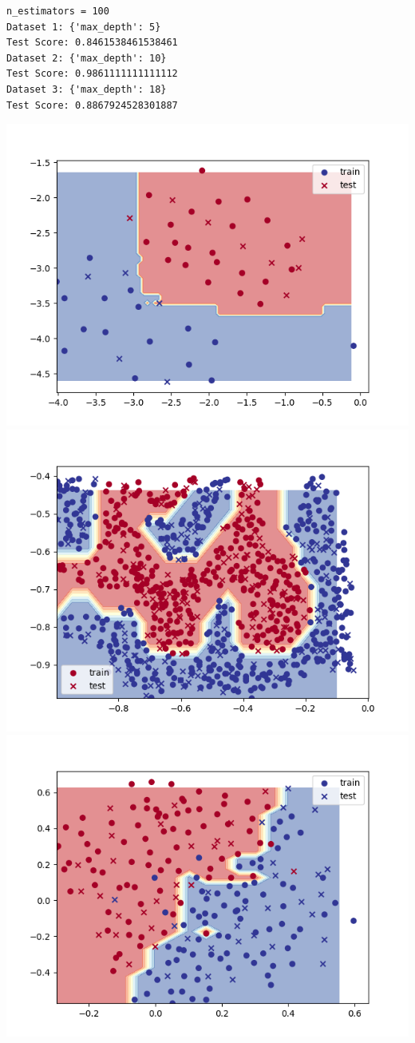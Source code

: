     \begin{verbatim}
n_estimators = 100
Dataset 1: {'max_depth': 5}
Test Score: 0.8461538461538461
Dataset 2: {'max_depth': 10}
Test Score: 0.9861111111111112
Dataset 3: {'max_depth': 18}
Test Score: 0.8867924528301887
    \end{verbatim}
    \includegraphics[width=\textwidth / 2]{plots/randomtree_nest100_1}
    \includegraphics[width=\textwidth / 2]{plots/randomtree_nest100_2}
    \includegraphics[width=\textwidth / 2]{plots/randomtree_nest100_3}

